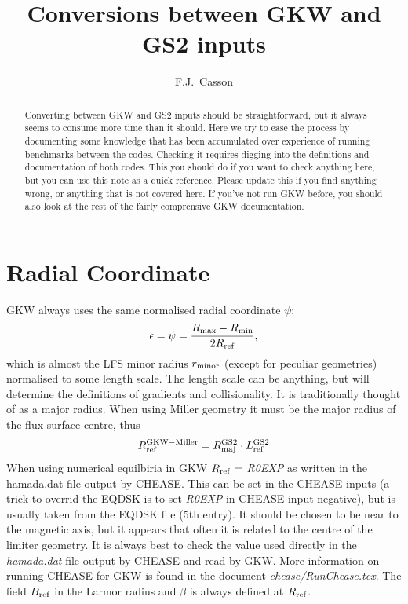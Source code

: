 \documentclass[a4paper,10pt]{article}
\title{Conversions between GKW and GS2 inputs}
\author{F.J.~Casson}
\newcommand{\name}[1]{\textsl{#1}} %
\begin{document}
\maketitle

\begin{abstract}

Converting between GKW and GS2 inputs should be straightforward, but it always seems to consume more time than it should.  Here we try to ease the process by documenting some knowledge that has been accumulated over experience of running benchmarks between the codes.  Checking it requires digging into the definitions and documentation of both codes.  This you should do if you want to check anything here, but you can use this note as a quick reference.  Please update this if you find anything wrong, or anything that is not covered here.  If you've not run GKW before, you should also look at the rest of the fairly comprensive GKW documentation.

\end{abstract}

\section{Radial Coordinate}

GKW always uses the same normalised radial coordinate $\psi$:
\begin{equation}
 \label{eq:psi-def}
 \epsilon = \psi = \frac{R_{\rm max}-R_{\rm min}}{2R_{\rm ref}},
\end{equation}
which is almost the LFS minor radius $r_{\rm minor}$ (except for peculiar geometries) normalised to some length scale.  The length scale can be anything, but will determine the definitions of gradients and collisionality.  It is traditionally thought of as a major radius.  When using Miller geometry it must be the major radius of the flux surface centre, thus
\begin{equation}
 R^{\rm GKW-Miller}_{\rm ref} = R^{\rm GS2}_{\rm maj} \cdot L_{\rm ref}^{\rm GS2}
\end{equation}
When using numerical equilbiria in GKW $R_{\rm ref} =$ \name{R0EXP} as written in the hamada.dat file output by CHEASE.  This can be set in the CHEASE inputs (a trick to overrid the EQDSK is to set \name{R0EXP} in CHEASE input negative), but is usually taken from the EQDSK file (5th entry).  It should be chosen to be near to the magnetic axis, but it appears that often it is related to the centre of the limiter geometry. It is always best to check the value used directly in the \name{hamada.dat} file output by CHEASE and read by GKW.  More information on running CHEASE for GKW is found in the document \name{chease/RunChease.tex}. The field $B_{\rm ref}$ in the Larmor radius and $\beta$ is always defined at $R_{\rm ref}$.
\end{document}
